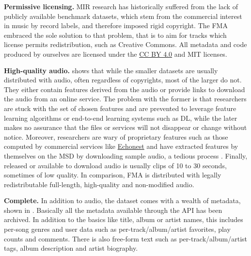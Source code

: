 \documentclass{article}
\newcommand{\todo}[1]{{\color{red} #1}}
\begin{document}
\textbf{Permissive licensing.} MIR research has historically suffered from the lack of publicly available benchmark datasets, which stem from the commercial interest in music by record labels, and therefore imposed rigid copyright.
The FMA embraced the sole solution to that problem, that is to aim for tracks which license permits redistribution, such as Creative Commons.
All metadata and code produced by ourselves are licensed under the \href{https://creativecommons.org/licenses/by/4.0)}{
CC BY 4.0} and MIT licenses.

\textbf{High-quality audio.}
 shows that while the smaller datasets are usually distributed with audio, often regardless of copyrights, most of the larger do not.
They either contain features derived from the audio or provide links to download the audio from an online service. The problem with the former is that researchers are stuck with the set of chosen features and are prevented to leverage feature learning algorithms or end-to-end learning systems such as DL, while the later  makes no assurance that the files or services will not disappear or change without notice.
Moreover, researchers are wary of proprietary features such as those computed by commercial services like \href{http://the.echonest.com/}{Echonest} and have extracted features by themselves on the MSD by downloading sample audio, a tedious process \cite{msd_features}.
Finally, released or available to download audio is usually clips of 10 to 30 seconds, sometimes of low quality.
In comparison, FMA is distributed with legally redistributable full-length, high-quality and non-modified audio.

\textbf{Complete.} In addition to audio, the dataset comes with a wealth of metadata, shown in . Basically all the metadata available through the API has been archived. In addition to the basics like title, album or artist names, this includes per-song genres and user data such as per-track/album/artist favorites, play counts and comments.
There is also free-form text such as per-track/album/artist tags, album description and artist biography.
\end{document}
